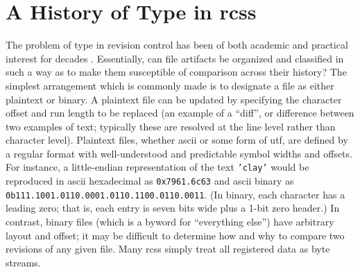 \documentclass[twoside]{article}
\begin{document}
\section{A History of Type in {\sc rcs}s}

The problem of type in revision control has been of both academic and practical interest for decades \citep{Perry1987}.  Essentially, can file artifacts be organized and classified in such a way as to make them susceptible of comparison across their history?  The simplest arrangement which is commonly made is to designate a file as either plaintext or binary.  A plaintext file can be updated by specifying the character offset and run length to be replaced (an example of a “diff”, or difference between two examples of text; typically these are resolved at the line level rather than character level).  Plaintext files, whether {\sc ascii} or some form of {\sc utf}, are defined by a regular format with well-understood and predictable symbol widths and offsets.  For instance, a little-endian representation of the text \texttt{'clay'} would be reproduced in {\sc ascii} hexadecimal as \texttt{0x7961.6c63} and {\sc ascii} binary as \texttt{0b111.1001.0110.0001.0110.1100.0110.0011}.  (In binary, each character has a leading zero; that is, each entry is seven bits wide plus a 1-bit zero header.)  In contrast, binary files (which is a byword for “everything else”) have arbitrary layout and offset; it may be difficult to determine how and why to compare two revisions of any given file.
Many {\rsc rcs}s simply treat all registered data as byte streams.
\end{document}
